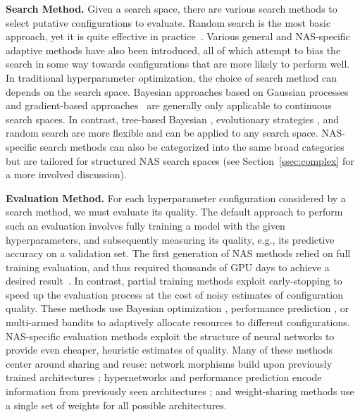 \documentclass[acmlarge, nonacm]{acmart}
\begin{document}
\textbf{Search Method.} Given a search space, there are various search methods to select putative configurations to evaluate. Random search is the most basic approach, yet it is quite effective in practice~\cite{bergstra2012random,hyperband}. Various general and NAS-specific adaptive methods 
have also been introduced, all of which      
attempt to bias the search in some way towards configurations that are more likely to perform well.  
In traditional hyperparameter optimization, the choice of search method can depends on the search space.  Bayesian approaches based on Gaussian processes \citep{snoek2012practical,fabolas2016, Swersky2013Multi,kandasamy2016gaussian} and gradient-based approaches~\citep{Bengio2000,maclaurin2015gradient} are generally only applicable to continuous search spaces.  In contrast, tree-based Bayesian \citep{Hutter2011, Bergstra2011}, evolutionary strategies \citep{olson2016tpot}, and random search are more flexible and can be applied to any search space. 
NAS-specific search methods can also be categorized into the same broad categories but are tailored for structured NAS search spaces (see Section~\ref{ssec:complex} for a more involved discussion). 

\textbf{Evaluation Method.} For each hyperparameter configuration considered by a search method, we must evaluate its quality. The default approach to perform such an evaluation involves fully training a model with the given hyperparameters, and subsequently measuring its quality, e.g., its predictive accuracy on a validation set. The first generation of NAS methods relied on full training evaluation, and thus required thousands of GPU days to achieve a desired result~\citep{nasRL,eshp2017,Zoph2018LearningTA, Real2018}.
In contrast, partial training methods exploit early-stopping to speed up the evaluation process at the cost of noisy estimates of configuration quality. These methods use Bayesian optimization \citep{fabolas2016, kandasamy2016gaussian,falkner2018bohb}, performance prediction \citep{vizier2017,earlystopping2015}, or multi-armed bandits \citep{JamiesonTalwalkar2015,hyperband,asha} to adaptively allocate resources to different configurations.
NAS-specific evaluation methods
exploit the structure of neural networks to provide even cheaper, heuristic estimates of quality. 
Many of these methods center around sharing and reuse: network morphisms build upon previously trained architectures \citep{cai2018path,Elsken2018pareto,Jin2018}; hypernetworks and performance prediction encode information from previously seen architectures \citep{brock2018smash,pnas2018,zhang2018graph}; and weight-sharing methods \citep{pham18ENAS, liu2018darts, bender2018understanding,xie2018snas,cai2018proxylessnas} use a single set of weights for all possible architectures.  
\end{document}
